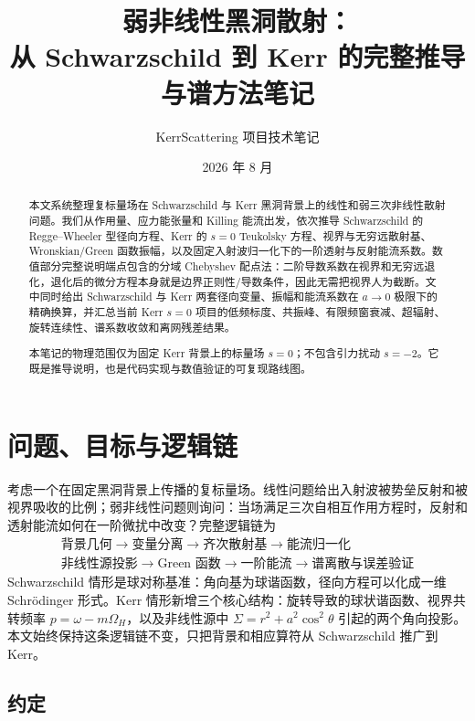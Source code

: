 \documentclass[UTF8,a4paper,11pt]{ctexart}
\title{\bfseries 弱非线性黑洞散射：\\[3pt]
从 Schwarzschild 到 Kerr 的完整推导与谱方法笔记}
\author{KerrScattering 项目技术笔记}
\date{2026 年 8 月}
\begin{document}
\maketitle

\begin{abstract}
本文系统整理复标量场在 Schwarzschild 与 Kerr 黑洞背景上的线性和弱三次非线性散射问题。我们从作用量、应力能张量和 Killing 能流出发，依次推导 Schwarzschild 的 Regge--Wheeler 型径向方程、Kerr 的 $s=0$ Teukolsky 方程、视界与无穷远散射基、Wronskian/Green 函数振幅，以及固定入射波归一化下的一阶透射与反射能流系数。数值部分完整说明端点包含的分域 Chebyshev 配点法：二阶导数系数在视界和无穷远退化，退化后的微分方程本身就是边界正则性/导数条件，因此无需把视界人为截断。文中同时给出 Schwarzschild 与 Kerr 两套径向变量、振幅和能流系数在 $a\to0$ 极限下的精确换算，并汇总当前 Kerr $s=0$ 项目的低频标度、共振峰、有限频窗衰减、超辐射、旋转连续性、谱系数收敛和离网残差结果。

本笔记的物理范围仅为固定 Kerr 背景上的标量场 $s=0$；不包含引力扰动 $s=-2$。它既是推导说明，也是代码实现与数值验证的可复现路线图。
\end{abstract}

\tableofcontents
\clearpage

\section{问题、目标与逻辑链}

考虑一个在固定黑洞背景上传播的复标量场。线性问题给出入射波被势垒反射和被视界吸收的比例；弱非线性问题则询问：当场满足三次自相互作用方程时，反射和透射能流如何在一阶微扰中改变？完整逻辑链为
\begin{equation}
\boxed{\begin{gathered}
\text{背景几何}\to\text{变量分离}\to\text{齐次散射基}
\to\text{能流归一化}\\
\text{非线性源投影}\to\text{Green 函数}\to\text{一阶能流}
\to\text{谱离散与误差验证}
\end{gathered}}
\end{equation}
Schwarzschild 情形是球对称基准：角向基为球谐函数，径向方程可以化成一维 Schr\"odinger 形式。Kerr 情形新增三个核心结构：旋转导致的球状谐函数、视界共转频率 $p=\omega-m\Omega_H$，以及非线性源中 $\Sigma=r^2+a^2\cos^2\theta$ 引起的两个角向投影。本文始终保持这条逻辑链不变，只把背景和相应算符从 Schwarzschild 推广到 Kerr。

\subsection{约定}
\end{document}
